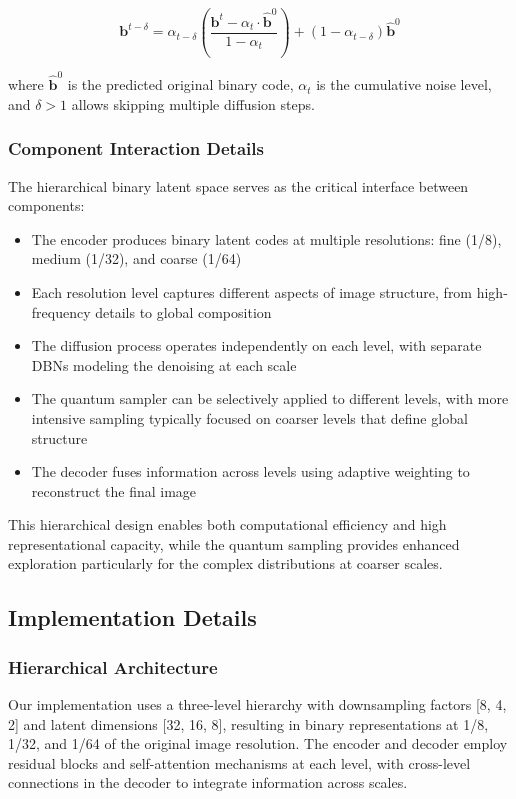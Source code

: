 \documentclass[10pt,twocolumn,letterpaper]{article}
\newcommand{\bm}[1]{\boldsymbol{#1}}
\newcommand{\binary}{\bm{b}}
\begin{document}
\begin{equation}
\binary^{t-\delta} = \alpha_{t-\delta}\left(\frac{\binary^t - \alpha_t \cdot \hat{\binary}^0}{1-\alpha_t}\right) + (1-\alpha_{t-\delta})\hat{\binary}^0
\end{equation}

where $\hat{\binary}^0$ is the predicted original binary code, $\alpha_t$ is the cumulative noise level, and $\delta > 1$ allows skipping multiple diffusion steps.

\subsubsection{Component Interaction Details}

The hierarchical binary latent space serves as the critical interface between components:

\begin{itemize}
    \item The encoder produces binary latent codes at multiple resolutions: fine (1/8), medium (1/32), and coarse (1/64)
    \item Each resolution level captures different aspects of image structure, from high-frequency details to global composition
    \item The diffusion process operates independently on each level, with separate DBNs modeling the denoising at each scale
    \item The quantum sampler can be selectively applied to different levels, with more intensive sampling typically focused on coarser levels that define global structure
    \item The decoder fuses information across levels using adaptive weighting to reconstruct the final image
\end{itemize}

This hierarchical design enables both computational efficiency and high representational capacity, while the quantum sampling provides enhanced exploration particularly for the complex distributions at coarser scales.

\subsection{Implementation Details}
\label{sec:implementation}

\subsubsection{Hierarchical Architecture}
Our implementation uses a three-level hierarchy with downsampling factors [8, 4, 2] and latent dimensions [32, 16, 8], resulting in binary representations at 1/8, 1/32, and 1/64 of the original image resolution. The encoder and decoder employ residual blocks and self-attention mechanisms at each level, with cross-level connections in the decoder to integrate information across scales.
\end{document}
